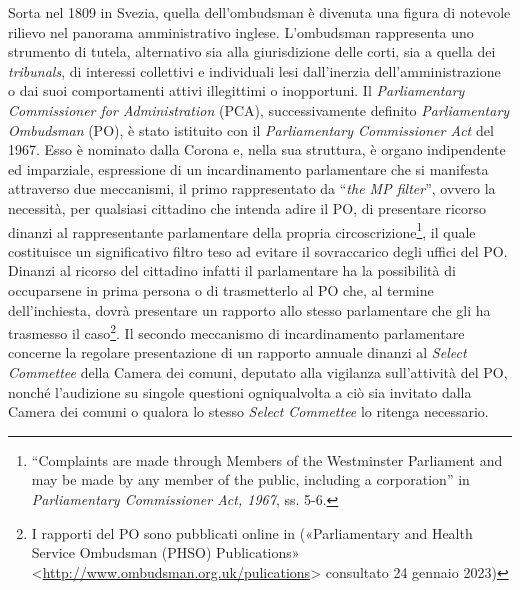 \documentclass[12pt,it,a4paper,]{report}
\begin{document}
Sorta nel 1809 in Svezia, quella dell'ombudsman è divenuta una figura di
notevole rilievo nel panorama amministrativo inglese. L'ombudsman
rappresenta uno strumento di tutela, alternativo sia alla giurisdizione
delle corti, sia a quella dei \emph{tribunals}, di interessi collettivi
e individuali lesi dall'inerzia dell'amministrazione o dai suoi
comportamenti attivi illegittimi o inopportuni. Il \emph{Parliamentary
Commissioner for Administration} (PCA), successivamente definito
\emph{Parliamentary Ombudsman} (PO), è stato istituito con il
\emph{Parliamentary Commissioner Act} del 1967. Esso è nominato dalla
Corona e, nella sua struttura, è organo indipendente ed imparziale,
espressione di un incardinamento parlamentare che si manifesta
attraverso due meccanismi, il primo rappresentato da ``\emph{the MP
filter}'', ovvero la necessità, per qualsiasi cittadino che intenda
adire il PO, di presentare ricorso dinanzi al rappresentante
parlamentare della propria circoscrizione\footnote{``Complaints are made
  through Members of the Westminster Parliament and may be made by any
  member of the public, including a corporation'' in \emph{Parliamentary
  Commissioner Act, 1967}, ss. 5-6.}, il quale costituisce un
significativo filtro teso ad evitare il sovraccarico degli uffici del
PO. Dinanzi al ricorso del cittadino infatti il parlamentare ha la
possibilità di occuparsene in prima persona o di trasmetterlo al PO che,
al termine dell'inchiesta, dovrà presentare un rapporto allo stesso
parlamentare che gli ha trasmesso il caso\footnote{I rapporti del PO
  sono pubblicati online in ({«Parliamentary and {Health Service
  Ombudsman} ({PHSO}) Publications»}
  \textless{}\url{http://www.ombudsman.org.uk/pulications}\textgreater{}
  consultato 24 gennaio 2023)}. Il secondo meccanismo di incardinamento
parlamentare concerne la regolare presentazione di un rapporto annuale
dinanzi al \emph{Select Commettee} della Camera dei comuni, deputato
alla vigilanza sull'attività del PO, nonché l'audizione su singole
questioni ogniqualvolta a ciò sia invitato dalla Camera dei comuni o
qualora lo stesso \emph{Select Commettee} lo ritenga necessario.
\end{document}
